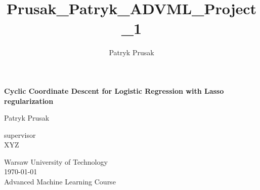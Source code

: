 \documentclass[12pt]{article}
\begin{document}

\title{Prusak_Patryk_ADVML_Project_1}
\author{\normalsize Patryk Prusak }
\hspace{0pt}
\vfill
\begin{center}

    \textbf{\huge{Cyclic Coordinate Descent for Logistic Regression with Lasso regularization}}
    
\end{center}

\vspace{0.5cm}
\begin{center}
    \normalsize{Patryk Prusak}
\end{center}
\vspace{0.5cm}
\begin{center}
    \normalsize{supervisor}\\
    \vspace{0.3cm}
    \normalsize{XYZ}
\end{center}

\vspace{0.5cm}

\begin{center}
\normalsize{Warsaw University of Technology} \\
\vspace{0.3cm}
\normalsize{\today} \\
\vspace{0.3cm}
Advanced Machine Learning Course
\end{center}

\vspace{1cm}


\tableofcontents
\vfill
\hspace{0pt}
\newpage

\end{document}
